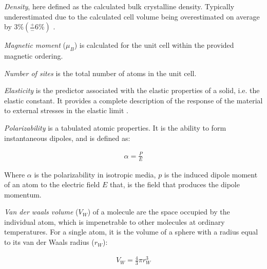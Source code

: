 	
	\textit{Density}, here defined as the calculated bulk crystalline density. Typically underestimated due to the calculated cell volume being overestimated on average by $3\% (\frac{+}{-} 6\%)$ \cite{jain2011high}.

	
\textit{Magnetic moment} ($\si{\mu_B}$) is calculated for the unit cell within the provided magnetic ordering.
	
	\textit{Number of sites} is the total number of atoms in the unit cell.
	
	\textit{Elasticity} is the predictor associated with the elastic properties of a solid, i.e. the elastic constant. It provides a complete description of the response of the material to external stresses in the elastic limit \cite{de2015charting}.
	
	
	\textit{Polarizability} is a tabulated atomic properties. It is the ability to form instantaneous  dipoles, and is defined as:
	
	\begin{align}
	\alpha = \frac{P}{E}
	\end{align}
	
	Where $\alpha $ is the polarizability in isotropic media, $p$ is the induced dipole moment of an atom to the electric field $E$ that, is the field that produces the dipole momentum.
	
	\textit{Van der waals volume} ($V_W$) of a molecule are the space occupied by the individual atom, which is impenetrable to other molecules at ordinary temperatures. For a single atom, it is the volume of a sphere with a radius equal to its van der Waals radius ($r_W$):
	
	\begin{align}
	V_W = \frac{4}{3} \pi r^3_W
	\end{align}
	



	


